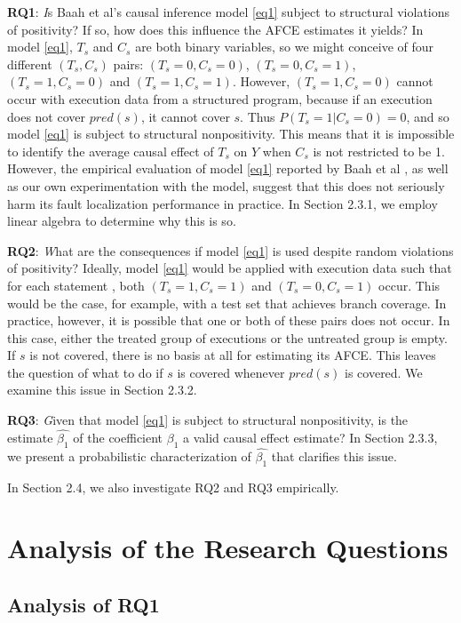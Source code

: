 {\bf RQ1}: {\textit Is Baah et al’s causal inference model \eqref{eq1} subject to structural violations of positivity?  If so, how does this influence the AFCE estimates it yields?} In model \eqref{eq1}, $T_s$ and $C_s$ are both binary variables, so we might conceive of four different $(T_s,C_s)$ pairs: $(T_s=0,C_s=0)$, $(T_s=0,C_s=1)$,  $(T_s=1,C_s=0)$ and $(T_s=1,C_s=1)$.  However, $(T_s=1,C_s=0)$ cannot occur with execution data from a structured program, because if an execution does not cover $pred(s)$, it cannot cover $s$.  Thus $P(T_s=1|C_s=0)=0$, and so model \eqref{eq1} is subject to structural nonpositivity.  This means that it is impossible to identify the average causal effect of $T_s$ on $Y$ when $C_s$ is not restricted to be 1.  However, the empirical evaluation of model \eqref{eq1} reported by Baah et al \cite{baah2010causal}, as well as our own experimentation with the model, suggest that this does not seriously harm its fault localization performance in practice.  In Section 2.3.1, we employ linear algebra to determine why this is so.

{\bf RQ2}: {\textit What are the consequences if model \eqref{eq1} is used despite random violations of positivity?}  Ideally, model \eqref{eq1} would be applied with execution data such that for each statement , both $(T_s=1,C_s=1)$ and $(T_s=0,C_s=1)$ occur.  This would be the case, for example, with a test set that achieves branch coverage.  In practice, however, it is possible that one or both of these pairs does not occur.  In this case, either the treated group of executions or the untreated group is empty.  If $s$ is not covered, there is no basis at all for estimating its AFCE.  This leaves the question of what to do if $s$ is covered whenever $pred(s)$ is covered.  We examine this issue in Section 2.3.2.

{\bf RQ3}: {\textit Given that model \eqref{eq1} is subject to structural nonpositivity, is the estimate $\hat{\beta_1}$ of the coefficient $\beta_1$ a valid causal effect estimate?}  In Section 2.3.3, we present a probabilistic characterization of $\hat{\beta_1}$ that clarifies this issue. 

In Section 2.4, we also investigate RQ2 and RQ3 empirically.

\section{Analysis of the Research Questions}\label{sec3}
\subsection{Analysis of RQ1}\label{sec3.1}

